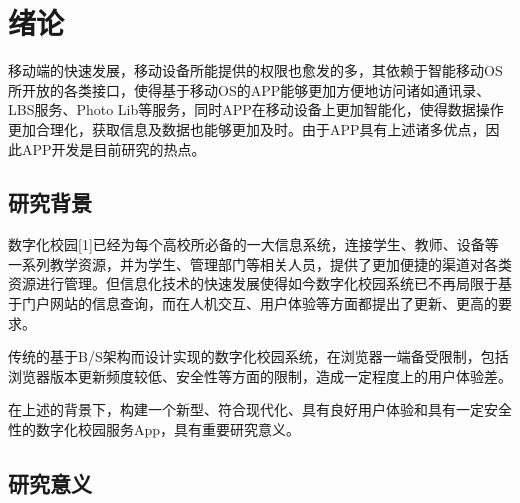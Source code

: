 \documentclass[oneside]{jufethesis}
\begin{document}
\tableofcontents

\pagestyle{mainmatter}  %

\section{绪论}

移动端的快速发展，移动设备所能提供的权限也愈发的多，其依赖于智能移动OS所开放的各类接口，使得基于移动OS的APP能够更加方便地访问诸如通讯录、LBS服务、Photo Lib等服务，同时APP在移动设备上更加智能化，使得数据操作更加合理化，获取信息及数据也能够更加及时。由于APP具有上述诸多优点，因此APP开发是目前研究的热点。

\subsection{研究背景}

数字化校园[1]已经为每个高校所必备的一大信息系统，连接学生、教师、设备等一系列教学资源，并为学生、管理部门等相关人员，提供了更加便捷的渠道对各类资源进行管理。但信息化技术的快速发展使得如今数字化校园系统已不再局限于基于门户网站的信息查询，而在人机交互、用户体验等方面都提出了更新、更高的要求。

传统的基于B/S架构而设计实现的数字化校园系统，在浏览器一端备受限制，包括浏览器版本更新频度较低、安全性等方面的限制，造成一定程度上的用户体验差。

在上述的背景下，构建一个新型、符合现代化、具有良好用户体验和具有一定安全性的数字化校园服务App，具有重要研究意义。

\subsection{研究意义}
\end{document}
